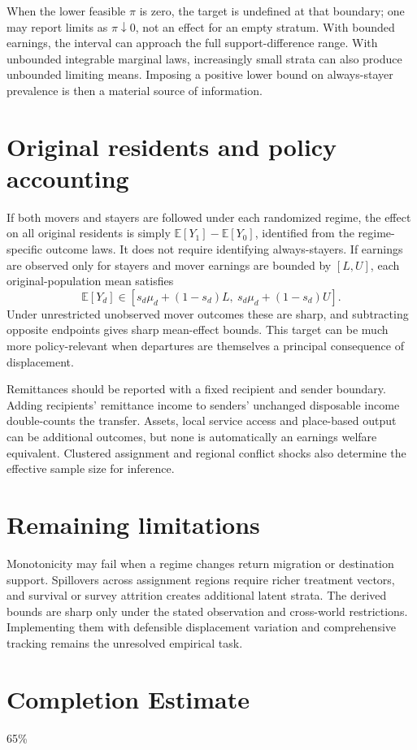 \documentclass[11pt]{article}
\newcommand{\E}{\mathbb E}
\begin{document}
When the lower feasible $\pi$ is zero, the target is undefined at that boundary; one may report limits as $\pi\downarrow0$, not an effect for an empty stratum. With bounded earnings, the interval can approach the full support-difference range. With unbounded integrable marginal laws, increasingly small strata can also produce unbounded limiting means. Imposing a positive lower bound on always-stayer prevalence is then a material source of information.

\section*{Original residents and policy accounting}
If both movers and stayers are followed under each randomized regime, the effect on all original residents is simply $\E[Y_1]-\E[Y_0]$, identified from the regime-specific outcome laws. It does not require identifying always-stayers. If earnings are observed only for stayers and mover earnings are bounded by $[L,U]$, each original-population mean satisfies
\[
 \E[Y_d]\in[s_d\mu_d+(1-s_d)L,\ s_d\mu_d+(1-s_d)U].
\]
Under unrestricted unobserved mover outcomes these are sharp, and subtracting opposite endpoints gives sharp mean-effect bounds. This target can be much more policy-relevant when departures are themselves a principal consequence of displacement.

Remittances should be reported with a fixed recipient and sender boundary. Adding recipients' remittance income to senders' unchanged disposable income double-counts the transfer. Assets, local service access and place-based output can be additional outcomes, but none is automatically an earnings welfare equivalent. Clustered assignment and regional conflict shocks also determine the effective sample size for inference.

\section*{Remaining limitations}
Monotonicity may fail when a regime changes return migration or destination support. Spillovers across assignment regions require richer treatment vectors, and survival or survey attrition creates additional latent strata. The derived bounds are sharp only under the stated observation and cross-world restrictions. Implementing them with defensible displacement variation and comprehensive tracking remains the unresolved empirical task.

\section{Completion Estimate}
65\%
\end{document}
